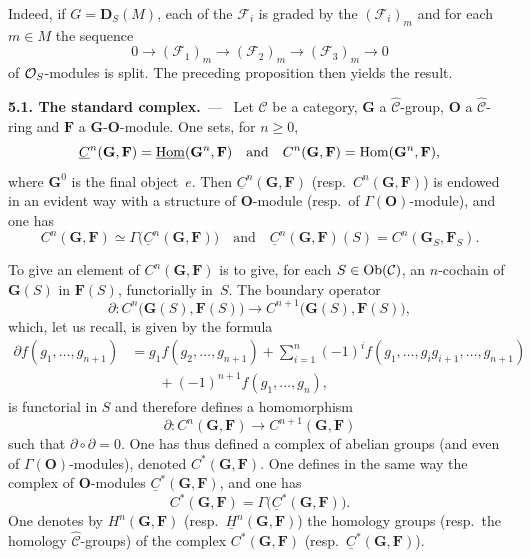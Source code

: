 Indeed, if \(G = \mathbf{D}_{S}(M)\), each of the \(\mathcal{F}_{i}\) is graded by the
\((\mathcal{F}_{i})_{m}\) and for each \(m \in M\) the sequence
\[
0 \longrightarrow (\mathcal{F}_{1})_{m} \longrightarrow
(\mathcal{F}_{2})_{m} \longrightarrow (\mathcal{F}_{3})_{m} \longrightarrow 0
\]
of \(\mathcal{O}_S\)-modules is split. The preceding proposition then yields the result.

\label{I.sec.5}

\par{}%
\noindent\textbf{5.1. The standard complex.}\ ---\ \label{I.5.1}%
{\renewcommand{\thefootnote}{(44)}}%
Let \(\mathcal{C}\) be a category, \(\mathbf{G}\) a
\(\widehat{\mathcal{C}}\)-group, \(\mathbf{O}\) a
\(\widehat{\mathcal{C}}\)-ring and \(\mathbf{F}\) a
\(\mathbf{G}\)-\(\mathbf{O}\)-module. One sets, for \(n \geqslant 0\),
\[
\underline{C}^{n}(\mathbf{G}, \mathbf{F})
= \underline{\operatorname{Hom}}(\mathbf{G}^{n}, \mathbf{F})
\quad\text{and}\quad
C^{n}(\mathbf{G}, \mathbf{F})
= \operatorname{Hom}(\mathbf{G}^{n}, \mathbf{F}),
\]
where \(\mathbf{G}^{0}\) is the final object~\(e\). Then
\(\underline{C}^{n}(\mathbf{G}, \mathbf{F})\)
(resp.\ \(C^{n}(\mathbf{G}, \mathbf{F})\)) is endowed in an evident way with a
structure of \(\mathbf{O}\)-module
(resp.\ of \(\Gamma(\mathbf{O})\)-module), and one has
\[
C^{n}(\mathbf{G}, \mathbf{F})
\simeq \Gamma\bigl(\underline{C}^{n}(\mathbf{G}, \mathbf{F})\bigr)
\quad\text{and}\quad
\underline{C}^{n}(\mathbf{G}, \mathbf{F})(S)
= C^{n}(\mathbf{G}_{S}, \mathbf{F}_{S}).
\]

To give an element of \(C^{n}(\mathbf{G}, \mathbf{F})\) is to give, for each
\(S \in \operatorname{Ob}(\mathcal{C})\), an \(n\)-cochain of \(\mathbf{G}(S)\) in
\(\mathbf{F}(S)\), functorially in~\(S\). The boundary operator
\[
\partial \colon C^{n}\bigl(\mathbf{G}(S), \mathbf{F}(S)\bigr)
\longrightarrow C^{n+1}\bigl(\mathbf{G}(S), \mathbf{F}(S)\bigr),
\]
which, let us recall, is given by the formula
\begin{align*}
\partial f(g_{1}, \ldots, g_{n+1})
&= g_{1} f(g_{2}, \ldots, g_{n+1})
+ \sum_{i=1}^{n} (-1)^{i}
f(g_{1}, \ldots, g_{i}g_{i+1}, \ldots, g_{n+1}) \\
&\qquad + (-1)^{n+1} f(g_{1}, \ldots, g_{n}),
\end{align*}
is functorial in \(S\) and therefore defines a homomorphism
\[
\partial \colon C^{n}(\mathbf{G}, \mathbf{F})
\longrightarrow C^{n+1}(\mathbf{G}, \mathbf{F})
\]
such that \(\partial \circ \partial = 0\). One has thus defined a complex of
abelian groups (and even of \(\Gamma(\mathbf{O})\)-modules), denoted
\(C^{*}(\mathbf{G}, \mathbf{F})\). One defines in the same way the complex of
\(\mathbf{O}\)-modules \(\underline{C}^{*}(\mathbf{G}, \mathbf{F})\), and one
has
\[
C^{*}(\mathbf{G}, \mathbf{F})
= \Gamma\bigl(\underline{C}^{*}(\mathbf{G}, \mathbf{F})\bigr).
\]
One denotes by \(H^{n}(\mathbf{G}, \mathbf{F})\)
(resp.\ \(\underline{H}^{n}(\mathbf{G}, \mathbf{F})\)) the homology groups
(resp.\ the homology \(\widehat{\mathcal{C}}\)-groups) of the complex
\(C^{*}(\mathbf{G}, \mathbf{F})\)
(resp.\ \(\underline{C}^{*}(\mathbf{G}, \mathbf{F})\)).

